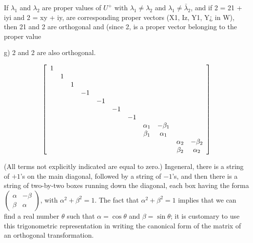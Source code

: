 If \(\lambda_1\) and \(\lambda_2\) are proper values of \(U^+\) with \(\lambda_1 \neq \lambda_2\) and \(\lambda_1 \neq \bar{\lambda}_2\), and if 2 = 21 + iyi and 2 = xy + iy, are corresponding proper vectors (X1, Iz, Y1, Y¿ in W), then 21 and 2 are orthogonal and (since 2, is a proper vector belonging to the proper value {g) 2 and 2 are also orthogonal.


\begin{equation*}
    \left[
        \begin{array}{*{11}c}
            1 & {} & {} & {} & {} & {} & {} & {} & {} & {} & {} \\
            {} & 1 & {} & {} & {} & {} & {} & {} & {} & {} & {} \\
            {} & {} & 1 & {} & {} & {} & {} & {} & {} & {} & {} \\
            {} & {} & {} & -1 & {} & {} & {} & {} & {} & {} & {} \\
            {} & {} & {} & {} & -1 & {} & {} & {} & {} & {} & {} \\
            {} & {} & {} & {} & {} & -1 & {} & {} & {} & {} & {} \\
            {} & {} & {} & {} & {} & {} & -1 & {} & {} & {} & {} \\
            {} & {} & {} & {} & {} & {} & {} & \alpha_1 & -\beta_1 & {} & {} \\
            {} & {} & {} & {} & {} & {} & {} & \beta_1 & \alpha_1 & {} & {} \\
            {} & {} & {} & {} & {} & {} & {} & {} & {} & \alpha_2 & -\beta_2 \\
            {} & {} & {} & {} & {} & {} & {} & {} & {} & \beta_2 & \alpha_2 
        \end{array}
    \right]
\end{equation*}

(All terms not explicitly indicated are equal to zero.) Ingeneral, there is a
string of \(+1\)'s on the main diagonal, followed by a string of \(-1\)'s, and
then there is a string of two-by-two boxes running down the diagonal, each box
having the forma \(\begin{pmatrix} \alpha & -\beta \\ \beta & \alpha
\end{pmatrix}\), with \(\alpha^2 + \beta^2 =1\). The fact that \(\alpha^2 +
\beta^2 =1\) implies that we can find a real number \(\theta\) such that
\(\alpha = \cos \theta\) and \(\beta = \sin \theta\); it is customary to use
this trigonometric representation in writing the canonical form of the matrix of
an orthogonal transformation.

}
